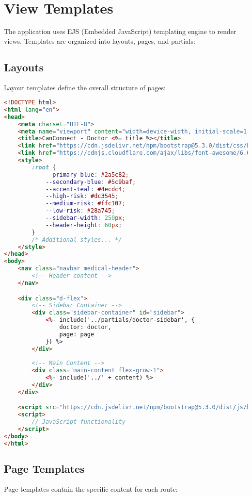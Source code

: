 \documentclass[12pt,a4paper]{report}
\begin{document}
\section{View Templates}
The application uses EJS (Embedded JavaScript) templating engine to render views. Templates are organized into layouts, pages, and partials:

\subsection{Layouts}
Layout templates define the overall structure of pages:

\begin{lstlisting}[language=HTML]
<!DOCTYPE html>
<html lang="en">
<head>
    <meta charset="UTF-8">
    <meta name="viewport" content="width=device-width, initial-scale=1.0">
    <title>CanConnect - Doctor <%= title %></title>
    <link href="https://cdn.jsdelivr.net/npm/bootstrap@5.3.0/dist/css/bootstrap.min.css" rel="stylesheet">
    <link href="https://cdnjs.cloudflare.com/ajax/libs/font-awesome/6.0.0/css/all.min.css" rel="stylesheet">
    <style>
        :root {
            --primary-blue: #2a5c82;
            --secondary-blue: #5c9baf;
            --accent-teal: #4ecdc4;
            --high-risk: #dc3545;
            --medium-risk: #ffc107;
            --low-risk: #28a745;
            --sidebar-width: 250px;
            --header-height: 60px;
        }
        /* Additional styles... */
    </style>
</head>
<body>
    <nav class="navbar medical-header">
        <!-- Header content -->
    </nav>

    <div class="d-flex">
        <!-- Sidebar Container -->
        <div class="sidebar-container" id="sidebar">
            <%- include('../partials/doctor-sidebar', { 
                doctor: doctor,
                page: page 
            }) %>
        </div>
        
        <!-- Main Content -->
        <div class="main-content flex-grow-1">
            <%- include('../' + content) %>
        </div>
    </div>

    <script src="https://cdn.jsdelivr.net/npm/bootstrap@5.3.0/dist/js/bootstrap.bundle.min.js"></script>
    <script>
        // JavaScript functionality
    </script>
</body>
</html>
\end{lstlisting}

\subsection{Page Templates}
Page templates contain the specific content for each route:
\end{document}

